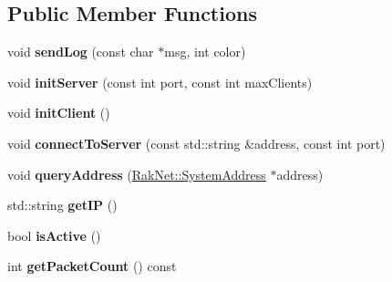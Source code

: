 \subsection*{Public Member Functions}
\begin{DoxyCompactItemize}
\item 
\hypertarget{class_champ_net_1_1_network_a3d25e6581e6a53201de1f68ed266724e}{void {\bfseries send\-Log} (const char $\ast$msg, int color)}\label{class_champ_net_1_1_network_a3d25e6581e6a53201de1f68ed266724e}

\item 
\hypertarget{class_champ_net_1_1_network_ac0d53751c94ef1df4cee9ce3719432bf}{void {\bfseries init\-Server} (const int port, const int max\-Clients)}\label{class_champ_net_1_1_network_ac0d53751c94ef1df4cee9ce3719432bf}

\item 
\hypertarget{class_champ_net_1_1_network_af7bda654a247a00e46d6adcc87c8d65b}{void {\bfseries init\-Client} ()}\label{class_champ_net_1_1_network_af7bda654a247a00e46d6adcc87c8d65b}

\item 
\hypertarget{class_champ_net_1_1_network_a9dbfd1e6e9e5f11720a6e8e41174df1e}{void {\bfseries connect\-To\-Server} (const std\-::string \&address, const int port)}\label{class_champ_net_1_1_network_a9dbfd1e6e9e5f11720a6e8e41174df1e}

\item 
\hypertarget{class_champ_net_1_1_network_a9cde161aafa694e5fef8d1c3fac3edd3}{void {\bfseries query\-Address} (\hyperlink{struct_rak_net_1_1_system_address}{Rak\-Net\-::\-System\-Address} $\ast$address)}\label{class_champ_net_1_1_network_a9cde161aafa694e5fef8d1c3fac3edd3}

\item 
\hypertarget{class_champ_net_1_1_network_a29734a6ba6ab488fc9ed9278ae7239d9}{std\-::string {\bfseries get\-I\-P} ()}\label{class_champ_net_1_1_network_a29734a6ba6ab488fc9ed9278ae7239d9}

\item 
\hypertarget{class_champ_net_1_1_network_a2266d0ef6af69462b1594246cea5b95d}{bool {\bfseries is\-Active} ()}\label{class_champ_net_1_1_network_a2266d0ef6af69462b1594246cea5b95d}

\item 
\hypertarget{class_champ_net_1_1_network_a29e2e816288fb30919547e221d2414bf}{int {\bfseries get\-Packet\-Count} () const }\label{class_champ_net_1_1_network_a29e2e816288fb30919547e221d2414bf}


\end{DoxyCompactItemize}
